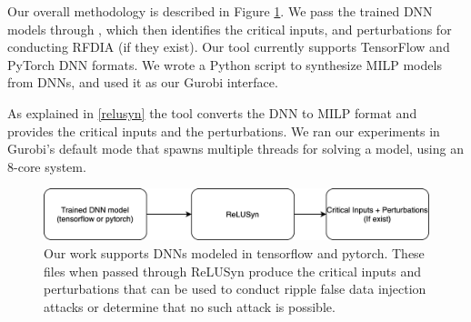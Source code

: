 Our overall methodology is described in Figure \ref{fig:methodology-2}. 
We pass the trained \ac{DNN} models through \tool, which then identifies the critical inputs, and perturbations for conducting \ac{RFDIA} (if they exist). 
Our tool currently supports TensorFlow and PyTorch   \ac{DNN} formats. 
We wrote a Python script to synthesize \ac{MILP} models from \ac{DNN}s, and used it as our Gurobi interface. 

As explained in \ref{relusyn} the tool converts the \ac{DNN} to \ac{MILP} format and provides the critical inputs and the perturbations. 
We ran our experiments in Gurobi's default mode that spawns multiple threads for solving a model, using an 8-core system. 
 

\begin{figure}
	\centering
	\includegraphics[width=0.7\linewidth]{"Images/Methodology2"}
	\caption[Methodology]{Our work supports DNNs modeled in tensorflow and pytorch. These files when passed through ReLUSyn produce the critical inputs and perturbations that can be used to conduct ripple false data injection attacks or determine that no such attack is possible.}
	\label{fig:methodology-2}
\end{figure}



